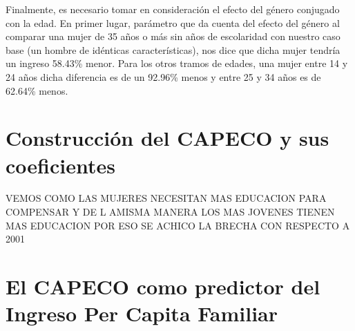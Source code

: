 Finalmente, es necesario tomar en consideración el efecto del género conjugado con la edad. En primer lugar, parámetro que da cuenta del efecto del género al comparar una mujer de 35 años o más sin años de escolaridad con nuestro caso base (un hombre de idénticas características), nos dice que dicha mujer tendría un ingreso 58.43\% menor. Para los otros tramos de edades, una mujer entre 14 y 24 años dicha diferencia es de un 92.96\% menos y entre 25 y 34 años es de 62.64\% menos. 



\section{Construcción del CAPECO y sus coeficientes}

VEMOS COMO LAS MUJERES NECESITAN MAS EDUCACION PARA COMPENSAR Y DE L AMISMA MANERA LOS MAS JOVENES TIENEN MAS EDUCACION POR ESO SE ACHICO LA BRECHA CON RESPECTO A 2001

\section{El CAPECO como predictor del Ingreso Per Capita Familiar}